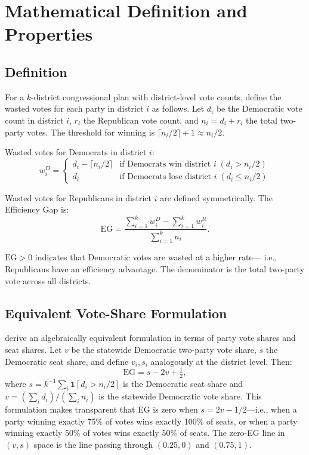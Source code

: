 \section{Mathematical Definition and Properties}
\label{sec:definition}

\subsection{Definition}

For a $k$-district congressional plan with district-level vote counts, define
the wasted votes for each party in district $i$ as follows. Let $d_i$ be the
Democratic vote count in district $i$, $r_i$ the Republican vote count, and
$n_i = d_i + r_i$ the total two-party votes. The threshold for winning is
$\lceil n_i/2 \rceil + 1 \approx n_i/2$.

Wasted votes for Democrats in district $i$:
\[
w_i^D = \begin{cases}
d_i - \lceil n_i/2 \rceil & \text{if Democrats win district } i \; (d_i > n_i/2) \\
d_i & \text{if Democrats lose district } i \; (d_i \leq n_i/2)
\end{cases}
\]

Wasted votes for Republicans in district $i$ are defined symmetrically.
The Efficiency Gap is:
\[
\text{EG} = \frac{\sum_{i=1}^k w_i^D - \sum_{i=1}^k w_i^R}{\sum_{i=1}^k n_i}.
\]

$\text{EG} > 0$ indicates that Democratic votes are wasted at a higher rate---
i.e., Republicans have an efficiency advantage. The denominator is the total
two-party vote across all districts.

\subsection{Equivalent Vote-Share Formulation}

\citet{stephanopoulosMcGhee2015} derive an algebraically equivalent formulation
in terms of party vote shares and seat shares. Let $v$ be the statewide
Democratic two-party vote share, $s$ the Democratic seat share, and define
$v_i, s_i$ analogously at the district level. Then:
\[
\text{EG} = s - 2v + \tfrac{1}{2},
\]
where $s = k^{-1}\sum_i \mathbf{1}[d_i > n_i/2]$ is the Democratic seat share
and $v = (\sum_i d_i)/(\sum_i n_i)$ is the statewide Democratic vote share.
This formulation makes transparent that EG is zero when $s = 2v - 1/2$---i.e.,
when a party winning exactly 75\% of votes wins exactly 100\% of seats, or
when a party winning exactly 50\% of votes wins exactly 50\% of seats. The
zero-EG line in $(v, s)$ space is the line passing through $(0.25, 0)$ and $(0.75, 1)$.

